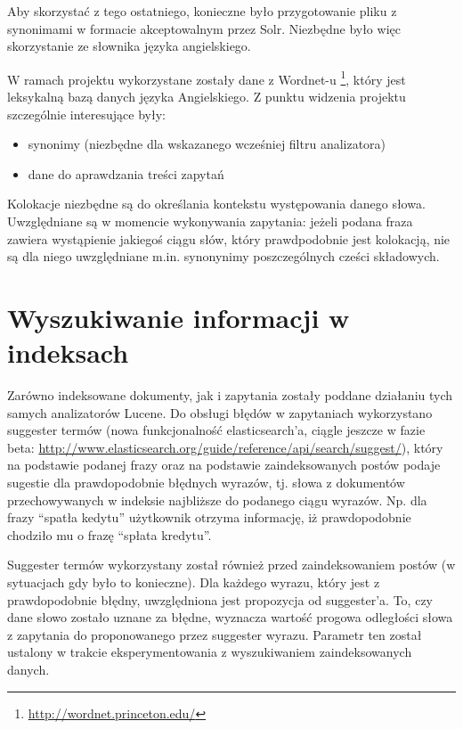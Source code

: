 \documentclass[runningheads]{llncs}
\begin{document}
Aby skorzystać z tego ostatniego, konieczne było przygotowanie pliku z
synonimami w formacie akceptowalnym przez Solr. Niezbędne było więc skorzystanie
ze słownika języka angielskiego.

W ramach projektu wykorzystane zostały dane z  Wordnet-u
\footnote{\url{http://wordnet.princeton.edu/}}, który jest leksykalną bazą
danych języka Angielskiego. Z punktu widzenia projektu szczególnie interesujące
były:
\begin{itemize}
  \item synonimy (niezbędne dla wskazanego wcześniej filtru analizatora)
  \item dane do aprawdzania treści zapytań
\end{itemize}

Kolokacje niezbędne są do określania kontekstu występowania danego słowa. 
Uwzględniane są w momencie wykonywania zapytania: jeżeli podana fraza zawiera
wystąpienie jakiegoś ciągu słów, który prawdpodobnie jest kolokacją, nie są
dla niego uwzględniane m.in. synonynimy poszczególnych cześci składowych.

\section{Wyszukiwanie informacji w indeksach}
\label{sec:wyszukiwanie-informacji-w-indeksach}
Zarówno indeksowane dokumenty, jak i zapytania zostały poddane działaniu tych
samych analizatorów Lucene.
Do obsługi błędów w zapytaniach  wykorzystano suggester termów (nowa
funkcjonalność elasticsearch’a, ciągle jeszcze w fazie beta:
\url{http://www.elasticsearch.org/guide/reference/api/search/suggest/}), który
na podstawie podanej frazy oraz na podstawie zaindeksowanych  postów podaje
sugestie dla prawdopodobnie błędnych wyrazów, tj. słowa  z dokumentów
przechowywanych w indeksie najbliższe do podanego ciągu wyrazów. Np.  dla frazy
“spatła kedytu” użytkownik otrzyma informację, iż prawdopodobnie chodziło mu o
frazę “spłata kredytu”.

Suggester termów wykorzystany został również przed zaindeksowaniem postów (w
sytuacjach gdy było to konieczne).
Dla każdego wyrazu, który jest z prawdopodobnie błędny, uwzględniona jest
propozycja od suggester’a. To, czy dane słowo zostało uznane za błędne,
wyznacza wartość progowa odległości słowa z zapytania do  proponowanego przez
suggester wyrazu. Parametr ten został ustalony  w trakcie eksperymentowania z
wyszukiwaniem zaindeksowanych danych. 

\end{document}

